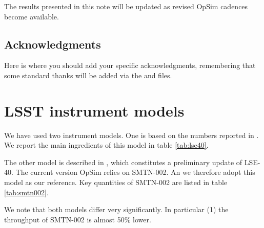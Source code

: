 \documentclass[\docopts]{\docclass}
\begin{document}
The results presented in this note will be updated as revised OpSim
cadences become available.



\subsection*{Acknowledgments}

Here is where you should add your specific acknowledgments, remembering that some standard thanks will be added via the  and  files.












\appendix

\section{LSST instrument models}
\label{sec:lsst_instrument_models}

We  have used  two instrument  models.  One  is based  on the  numbers
reported  in \cite[][LSE-40  hereafter]{LSE-40}.  We  report the  main
ingredients of this model in table \ref{tab:lse40}.

The other model is described in \cite[][hereafter
SMTN-002)]{SMTN-002}, which constitutes a preliminary update of
LSE-40.  The current version OpSim relies on SMTN-002. An we therefore
adopt this model as our reference. Key quantities of SMTN-002 are
listed in table \ref{tab:smtn002}.

We note that both models differ very significantly. In particular (1)
the throughput of SMTN-002 is almost 50\% lower.
\end{document}
